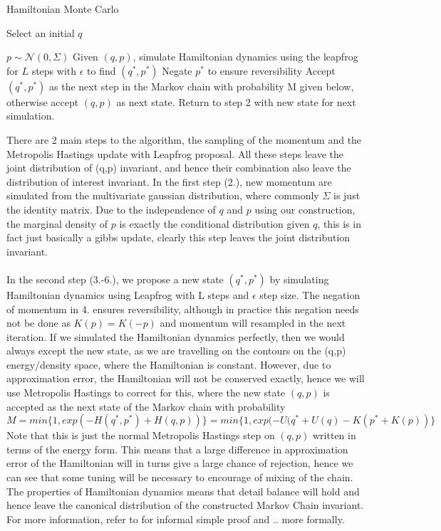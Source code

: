\documentclass[11pt]{article}
\begin{document}
\begin{algorithm}
\caption{Hamiltonian Monte Carlo}\label{euclid}
\begin{algorithmic}[1] 
\State Select an initial $q$ 

\State $p\sim \mathcal{N}(0,\Sigma)$
\State Given $(q,p)$, simulate Hamiltonian dynamics using the leapfrog for $L$ steps with $\epsilon$ to find $(q^{*},p^{*})$ 
\State Negate $p^{*}$ to ensure reversibility 
\State Accept $(q^{*}, p^{*})$ as the next step in the Markov chain with probability M given below, otherwise accept $(q,p)$ as next state.
\State Return to step 2 with new state for next simulation.
\end{algorithmic}
\end{algorithm}
\noindent There are 2 main steps to the algorithm, the sampling of the momentum and the Metropolis Hastings update with Leapfrog proposal. All these steps leave the joint distribution of (q,p) invariant, and hence their combination also leave the distribution of interest invariant. In the first step (2.), new momentum are simulated from the multivariate gaussian distribution, where commonly $\Sigma$ is just the identity matrix. Due to the independence of $q$ and $p$ using our construction, the marginal density of $p$ is exactly the conditional distribution given $q$, this is in fact just basically a gibbs update, clearly this step leaves the joint distribution invariant. 
\\
\\
In the second step (3.-6.), we propose a new state $(q^{*}, p^{*})$ by simulating Hamiltonian dynamics using Leapfrog with L steps and $\epsilon$ step size. The negation of momentum in 4. ensures reversibility, although in practice this negation needs not be done as $K(p)=K(-p)$ and momentum will resampled in the next iteration. If we simulated the Hamiltonian dynamics perfectly, then we would always except the new state, as we are travelling on the contours on the (q,p) energy/density space, where the Hamiltonian is constant. However, due to approximation error, the Hamiltonian will not be conserved exactly, hence we will use Metropolis Hastings to correct for this, where the new state $(q,p)$ is accepted as the next state of the Markov chain with probability
\begin{equation}
M=min\{1,exp(-H(q^{*},p^{*})+H(q,p))\} = min\{1, exp(-U(q^{*}+U(q)-K(p^{*}+K(p))\}
\end{equation}
Note that this is just the normal Metropolis Hastings step on $(q,p)$ written in terms of the energy form. This means that a large difference in approximation error of the Hamiltonian  will in turns give a large chance of rejection, hence we can see that some tuning will be necessary to encourage of mixing of the chain. The properties of Hamiltonian dynamics means that detail balance will hold and hence leave the canonical distribution of the constructed Markov Chain invariant. For more information, refer to for informal simple proof and .. more formally. 
\end{document}
